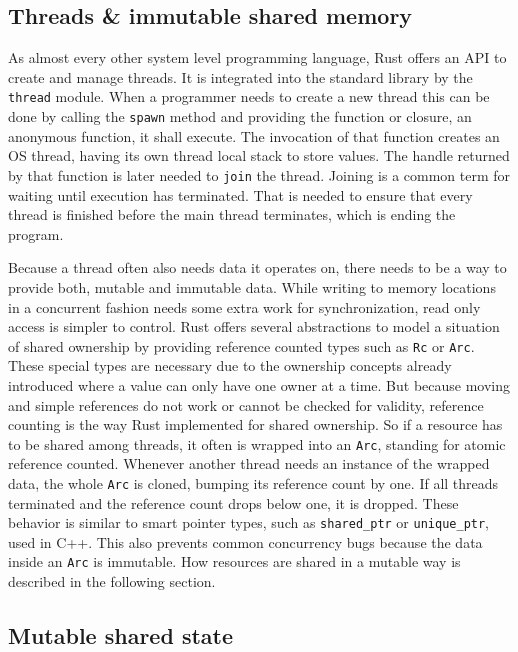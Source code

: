 \subsection{Threads \& immutable shared memory}

As almost every other system level programming language, Rust offers an \ac{API} to create and manage threads. It is integrated into the standard library by the \texttt{thread} module. When a programmer needs to create a new thread this can be done by calling the \texttt{spawn} method and providing the function or closure, an anonymous function, it shall execute. The invocation of that function creates an \ac{OS} thread, having its own thread local stack to store values. The handle returned by that function is later needed to \texttt{join} the thread. Joining is a common term for waiting until execution has terminated. That is needed to ensure that every thread is finished before the main thread terminates, which is ending the program.

Because a thread often also needs data it operates on, there needs to be a way to provide both, mutable and immutable data. While writing to memory locations in a concurrent fashion needs some extra work for synchronization, read only access is simpler to control. Rust offers several abstractions to model a situation of shared ownership by providing reference counted types such as \texttt{Rc} or \texttt{Arc}. These special types are necessary due to the ownership concepts already introduced where a value can only have one owner at a time. But because moving and simple references do not work or cannot be checked for validity, reference counting is the way Rust implemented for shared ownership. So if a resource has to be shared among threads, it often is wrapped into an \texttt{Arc}, standing for atomic reference counted. Whenever another thread needs an instance of the wrapped data, the whole \texttt{Arc} is cloned, bumping its reference count by one. If all threads terminated and the reference count drops below one, it is dropped. These behavior is similar to smart pointer types, such as \texttt{shared\_ptr} or \texttt{unique\_ptr}, used in C++. This also prevents common concurrency bugs because the data inside an \texttt{Arc} is immutable. How resources are shared in a mutable way is described in the following section.

\subsection{Mutable shared state}

